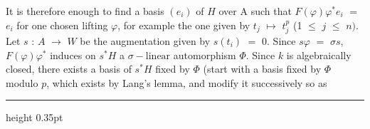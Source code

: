 \documentclass[9pt]{article}
\newcommand{\CanonText}[1]{\par{\fontsize{8.0}{9.35}\selectfont\RaggedRight #1\par}\vspace{2.2pt}}
\begin{document}
\begin{minipage}[t][\dimexpr\textheight-5pt\relax][t]{\textwidth}
\CanonText{It is therefore enough to find a basis \((e_{i})\) of \(H\) over A such that \(F(\varphi{})\varphi{}^{*}e_{i}\) \(=\) \(e_{i}\) for one chosen lifting \(\varphi{}\), for example the one given by \(t_{j}\) \(\mapsto{}\) \(t_{j}^{p}\) (1 \(\leq{}\) \(j\) \(\leq{}\) \(n)\). Let \(s\) : \(A\) \(\to{}\) \(W\) be the augmentation given by \(s(t_{i})\) \(=\) 0. Since \(s\varphi{}\) \(=\) \(\sigma{}s\), \(F(\varphi{})\varphi{}^{*}\) induces on \(s^{*}H\) a \(\sigma{}-\text{linear}\) automorphism \(\Phi{}\). Since \(k\) is algebraically closed, there exists a basis of \(s^{*}H\) fixed by \(\Phi{}\) (start with a basis fixed by \(\Phi{}\) modulo \(p\), which exists by Lang's lemma, and modify it successively so as}
\vfill
{\color{Accent}\hrule height 0.35pt}\vspace{3pt}
\end{minipage}
\newpage
\end{document}
